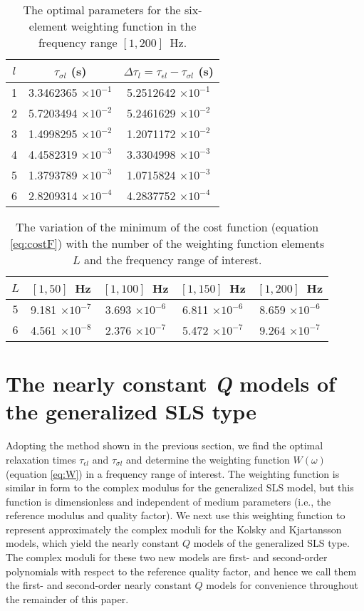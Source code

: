 \documentclass[article]{./macros/elsarticle_qh}
\begin{document}
\begin{table}[H]
\centering
\caption{The optimal parameters for the six-element weighting function in the frequency range $[1,200]$~Hz.}
\label{tab:tabl8}
\begin{tabular}{c c c}
\toprule
$l$ & $\tau_{\sigma l}$ (s) & $\Delta \tau_{l} = \tau_{\epsilon l}-\tau_{\sigma l}$ (s)\\
\midrule
1 &	3.3462365 $\times 10^{-1}$ & 5.2512642 $\times 10^{-1}$ \\
2 &	5.7203494 $\times 10^{-2}$ & 5.2461629 $\times 10^{-2}$ \\
3 &	1.4998295 $\times 10^{-2}$ & 1.2071172 $\times 10^{-2}$ \\
4 &	4.4582319 $\times 10^{-3}$ & 3.3304998 $\times 10^{-3}$ \\
5 &	1.3793789 $\times 10^{-3}$ & 1.0715824 $\times 10^{-3}$ \\
6 &	2.8209314 $\times 10^{-4}$ & 4.2837752 $\times 10^{-4}$ \\
\bottomrule   
\end{tabular}
\end{table}

\begin{table}[H]
\centering
\caption{The variation of the minimum of the cost function (equation \ref{eq:costF}) with the number of the weighting function elements $L$ and the frequency range of interest.}
\label{tab:tabl9}
\begin{tabular}{c c c c c}
\toprule
$L$ & $[1,50]$~Hz & $[1,100]$~Hz & $[1,150]$~Hz & $[1,200]$~Hz \\
\midrule
$5$ & 9.181 $\times 10^{-7}$  &	3.693 $\times 10^{-6}$  &	6.811  $\times 10^{-6}$ & 8.659 $\times 10^{-6}$ \\
$6$ & 4.561 $\times 10^{-8}$ & 2.376 $\times 10^{-7}$ & 5.472 $\times 10^{-7}$ & 9.264 $\times 10^{-7}$ \\
\bottomrule     
\end{tabular}
\end{table}

\section{The nearly constant \textit{Q} models of the generalized SLS type}
Adopting the method shown in the previous section, we find the optimal relaxation times $\tau_{\epsilon l}$ and $\tau_{\sigma l}$ and determine the weighting function $W(\omega)$ (equation \ref{eq:W}) in a frequency range of interest. The weighting function is similar in form to the complex modulus for the generalized SLS model, but this function is dimensionless and independent of medium parameters (i.e., the reference modulus and quality factor). We next use this weighting function to represent approximately the complex moduli for the Kolsky and Kjartansson models, which yield the nearly constant $Q$ models of the generalized SLS type. The complex moduli for these two new models are first- and second-order polynomials with respect to the reference quality factor, and hence we call them the first- and second-order nearly constant $Q$ models for convenience throughout the remainder of this paper. 
\end{document}
